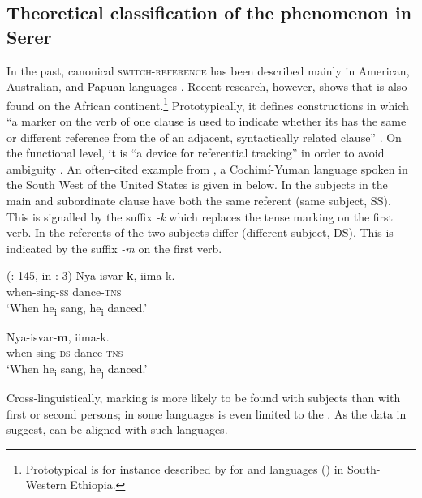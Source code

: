 \documentclass[output=paper
,newtxmath
,modfonts
,nonflat]{langsci/langscibook}
\begin{document}
\subsection{Theoretical classification of the phenomenon in Serer}\label{sec:apel:3.1}

In the past, canonical \textsc{switch-reference} has been described mainly in American, Australian, and Papuan languages \citep{HaimanMunro83}. Recent research, however, shows that  is also found on the African continent.\footnote{Prototypical  is for instance described by \citet{Treis2012} for  and  languages () in South-Western Ethiopia.}  Prototypically, it defines constructions in which “a marker on the verb of one clause is used to indicate whether its  has the same or different reference from the  of an adjacent, syntactically related clause” \citep[1]{Stirling1993}. On the functional level, it is “a device for referential tracking” in order to avoid ambiguity \citep[xi]{HaimanMunro83}. An often-cited example from , a Cochimí-Yuman language spoken in the South West of the United States is given in  below. In  the subjects in the main and subordinate clause have both the same referent (same subject, SS). This is signalled by the suffix \textit{-k} which replaces the tense marking on the first verb. In  the referents of the two subjects differ (different subject, DS). This is indicated by the suffix \textit{-m} on the first verb.

\ea\label{ex:apel:18}
{ (\citealt{Munro1980}: 145, in \citealt{Stirling1993}: 3)}
\ea\label{ex:apel:18a}
\gll   Nya-isvar-\textbf{k}, iima-k.\\
     when\textsc{-}sing\textsc{-ss} dance\textsc{-tns} \\
\glt ‘When he\textsubscript{i} sang, he\textsubscript{i} danced.’

\ex\label{ex:apel:18b}
\gll Nya-isvar-\textbf{m}, iima-k.\\
     when\textsc{-}sing\textsc{-ds} dance\textsc{-tns} \\
\glt ‘When he\textsubscript{i} sang, he\textsubscript{j} danced.’
\z
\z

Cross-linguistically,  marking is more likely to be found with  subjects than with first or second persons; in some languages  is even limited to the  \citep[xi]{HaimanMunro83}. As the data in  suggest,  can be aligned with such languages.
\end{document}
